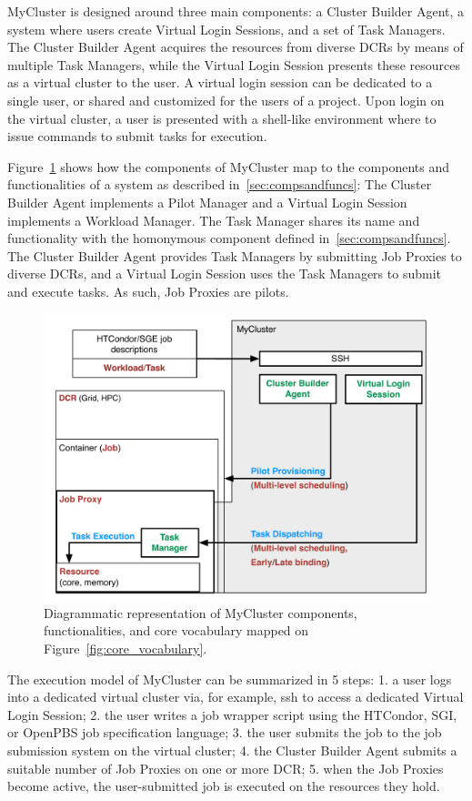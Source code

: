 \documentclass{sig-alternate}
\begin{document}
MyCluster is designed around three main components: a Cluster Builder Agent, a
system where users create Virtual Login Sessions, and a set of Task Managers.
The Cluster Builder Agent acquires the resources from diverse DCRs by means of
multiple Task Managers, while the Virtual Login Session presents these resources
as a virtual cluster to the user. A virtual login session can be dedicated to a
single user, or shared and customized for the users of a project. Upon login on
the virtual cluster, a user is presented with a shell-like environment where to
issue commands to submit tasks for execution.

Figure~\ref{fig:mycluster_comparison} shows how the components of MyCluster map
to the components and functionalities of a \pilot system as described
in~\ref{sec:compsandfuncs}: The Cluster Builder Agent implements a Pilot Manager
and a Virtual Login Session implements a Workload Manager. The Task Manager
shares its name and functionality with the homonymous component defined
in~\ref{sec:compsandfuncs}. The Cluster Builder Agent provides Task Managers by
submitting Job Proxies to diverse DCRs, and a Virtual Login Session uses the
Task Managers to submit and execute tasks. As such, Job Proxies are pilots.

\begin{figure}[t]
    \centering
        \includegraphics[width=.48\textwidth]{figures/mycluster_comparison.pdf}
    \caption{Diagrammatic representation of MyCluster components,
    functionalities, and core vocabulary mapped on
    Figure~\ref{fig:core_vocabulary}.}
    \label{fig:mycluster_comparison}
\end{figure}

The execution model of MyCluster can be summarized in 5 steps: 1. a user logs
into a dedicated virtual cluster via, for example, ssh to access a dedicated
Virtual Login Session; 2. the user writes a job wrapper script using the
HTCondor, SGI, or OpenPBS job specification language; 3. the user submits the
job to the job submission system on the virtual cluster; 4. the Cluster Builder
Agent submits a suitable number of Job Proxies on one or more DCR; 5. when the
Job Proxies become active, the user-submitted job is executed on the resources
they hold.
\end{document}
